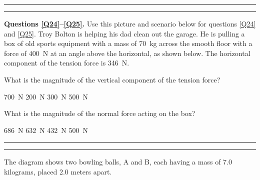 \documentclass[answers]{exam}
\begin{document}
\begin{questions}
\bigskip
\hrule\hrule


\begin{EnvUplevel}
    \textbf{Questions \ref{Q24}--\ref{Q25}.} Use this picture and scenario below for questions \ref{Q24} and \ref{Q25}. Troy Bolton is helping his dad clean out the garage. He is pulling a box of old sports equipment with a mass of \SI{70}{kg} across the smooth floor with a force of \SI{400}{N} at an angle above the horizontal, as shown below. The horizontal component of the tension force is \SI{346}{N}.
\end{EnvUplevel}

\begin{center}
\end{center}

\question \label{Q24}
What is the magnitude of the vertical component of the tension force?

\begin{randomizeoneparchoices}[norandomize]
    \choice \SI{700}{N}
    \correctchoice \SI{200}{N}
    \choice \SI{300}{N}
    \choice \SI{500}{N}
\end{randomizeoneparchoices}

\question \label{Q25}
What is the magnitude of the normal force acting on the box?

\begin{randomizeoneparchoices}[norandomize]
    \choice \SI{686}{N}
    \choice \SI{632}{N}
    \choice \SI{432}{N}
    \correctchoice \SI{500}{N}
\end{randomizeoneparchoices}
\bigskip
\hrule\hrule

\question
The diagram shows two bowling balls, A and B, each having a mass of 7.0 kilograms, placed 2.0 meters apart.

\begin{center}
\end{center}


\end{questions}
\end{document}
